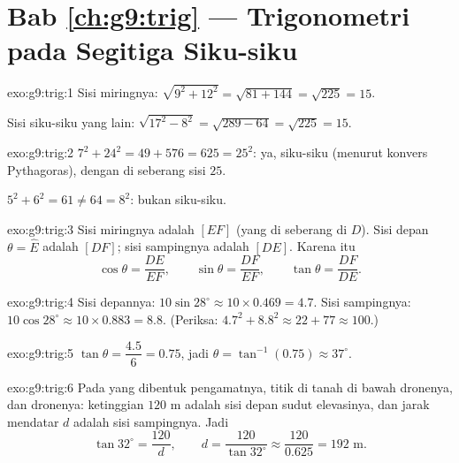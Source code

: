 \section*{Bab \ref{ch:g9:trig} --- Trigonometri pada Segitiga Siku-siku}

\begin{solution}{exo:g9:trig:1}
Sisi miringnya: $\sqrt{9^2 + 12^2} = \sqrt{81 + 144} = \sqrt{225} = 15$.

Sisi siku-siku yang lain: $\sqrt{17^2 - 8^2} = \sqrt{289 - 64} = \sqrt{225} = 15$.
\end{solution}

\begin{solution}{exo:g9:trig:2}
$7^2 + 24^2 = 49 + 576 = 625 = 25^2$: ya, siku-siku (menurut konvers
Pythagoras), dengan  di seberang sisi $25$.

$5^2 + 6^2 = 61 \neq 64 = 8^2$: bukan siku-siku.
\end{solution}

\begin{solution}{exo:g9:trig:3}
Sisi miringnya adalah $[EF]$ (yang di seberang  di
$D$). Sisi depan $\theta = \widehat E$ adalah $[DF]$; sisi sampingnya
adalah $[DE]$. Karena itu
\[
\cos\theta = \frac{DE}{EF}, \qquad
\sin\theta = \frac{DF}{EF}, \qquad
\tan\theta = \frac{DF}{DE}.
\]
\end{solution}

\begin{solution}{exo:g9:trig:4}
Sisi depannya: $10 \sin 28^\circ \approx 10 \times 0.469 = 4.7$.
Sisi sampingnya: $10 \cos 28^\circ \approx 10 \times 0.883 = 8.8$.
(Periksa: $4.7^2 + 8.8^2 \approx 22 + 77 \approx 100$.)
\end{solution}

\begin{solution}{exo:g9:trig:5}
$\tan\theta = \dfrac{4.5}{6} = 0.75$, jadi
$\theta = \tan^{-1}(0.75) \approx 37^\circ$.
\end{solution}

\begin{solution}{exo:g9:trig:6}
Pada  yang dibentuk pengamatnya, titik di tanah
di bawah dronenya, dan dronenya: ketinggian $120$ m adalah sisi
depan sudut elevasinya, dan jarak mendatar $d$ adalah sisi sampingnya.
Jadi
\[
\tan 32^\circ = \frac{120}{d},
\qquad
d = \frac{120}{\tan 32^\circ} \approx \frac{120}{0.625} = 192 \text{ m}.
\]
\end{solution}

